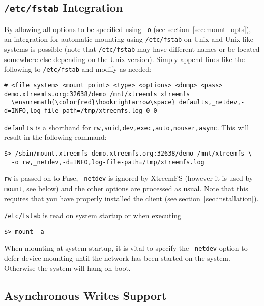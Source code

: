 \documentclass[a4paper,10pt]{book}
\begin{document}
\subsection{\texttt{/etc/fstab} Integration}
\label{sec:mount_vol:fstab}

By allowing all options to be specified using \texttt{-o} (see section~\ref{sec:mount_opts}), an integration for automatic mounting using \texttt{/etc/fstab} on Unix and Unix-like systems is possible (note that \texttt{/etc/fstab} may have different names or be located somewhere else depending on the Unix version). Simply append lines like the following to \texttt{/etc/fstab} and modify as needed:
\begin{Verbatim}[commandchars=\\\{\}]
# <file system> <mount point> <type> <options> <dump> <pass>
demo.xtreemfs.org:32638/demo /mnt/xtreemfs xtreemfs
  \ensuremath{\color{red}\hookrightarrow\space} defaults,_netdev,-d=INFO,log-file-path=/tmp/xtreemfs.log 0 0
\end{Verbatim}
\texttt{defaults} is a shorthand for \texttt{rw,suid,dev,exec,auto,nouser,async}. This will result in the following command:
\begin{verbatim}
$> /sbin/mount.xtreemfs demo.xtreemfs.org:32638/demo /mnt/xtreemfs \
  -o rw,_netdev,-d=INFO,log-file-path=/tmp/xtreemfs.log
\end{verbatim}
\texttt{rw} is passed on to Fuse, \texttt{\_netdev} is ignored by XtreemFS (however it is used by \texttt{mount}, see below) and the other options are processed as usual. Note that this requires that you have properly installed the client (see section~\ref{sec:installation}).

\texttt{/etc/fstab} is read on system startup or when executing
\begin{verbatim}
$> mount -a
\end{verbatim}
When mounting at system startup, it is vital to specify the \texttt{\_netdev} option to defer device mounting until the network has been started on the system. Otherwise the system will hang on boot.

\subsection{Asynchronous Writes Support}
\label{sec:async_writes}
\end{document}
